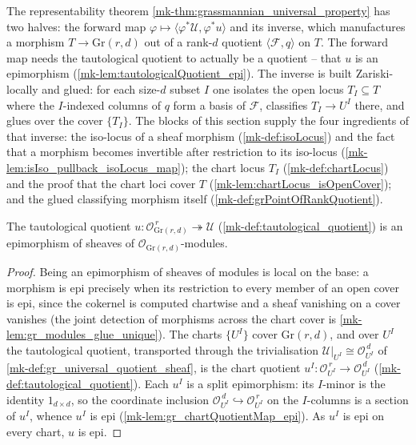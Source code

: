 The representability theorem \ref{mk-thm:grassmannian_universal_property} has two halves:
the forward map \(\varphi \mapsto \langle \varphi^{*}\mathcal{U}, \varphi^{*}u\rangle\)
and its inverse, which manufactures a morphism \(T \to \mathrm{Gr}(r,d)\) out of a rank-\(d\)
quotient \(\langle \mathcal{F}, q\rangle\) on \(T\). The forward map needs the tautological
quotient to actually be a quotient -- that \(u\) is an epimorphism
(\ref{mk-lem:tautologicalQuotient_epi}). The inverse is built Zariski-locally and glued: for
each size-\(d\) subset \(I\) one isolates the open locus \(T_I \subseteq T\) where the
\(I\)-indexed columns of \(q\) form a basis of \(\mathcal{F}\), classifies \(T_I \to U^I\)
there, and glues over the cover \(\{T_I\}\). The blocks of this section supply the four
ingredients of that inverse: the iso-locus of a sheaf morphism (\ref{mk-def:isoLocus}) and
the fact that a morphism becomes invertible after restriction to its iso-locus
(\ref{mk-lem:isIso_pullback_isoLocus_map}); the chart locus \(T_I\) (\ref{mk-def:chartLocus})
and the proof that the chart loci cover \(T\) (\ref{mk-lem:chartLocus_isOpenCover}); and the
glued classifying morphism itself (\ref{mk-def:grPointOfRankQuotient}).

\begin{lemma}\label{mk-lem:tautologicalQuotient_epi}
  \leanok

  The tautological quotient \(u : \mathcal{O}_{\mathrm{Gr}(r,d)}^{\,r}
  \twoheadrightarrow \mathcal{U}\) (\ref{mk-def:tautological_quotient}) is an epimorphism of
  sheaves of \(\mathcal{O}_{\mathrm{Gr}(r,d)}\)-modules.
\end{lemma}
\begin{proof}
  Being an epimorphism of sheaves of modules is local on the base: a morphism is epi
  precisely when its restriction to every member of an open cover is epi, since the
  cokernel is computed chartwise and a sheaf vanishing on a cover vanishes
  (the joint detection of morphisms across the chart cover is
  \ref{mk-lem:gr_modules_glue_unique}). The charts
  \(\{U^I\}\) cover \(\mathrm{Gr}(r,d)\), and over \(U^I\) the tautological quotient,
  transported through the trivialisation \(\mathcal{U}|_{U^I} \cong \mathcal{O}_{U^I}^{\,d}\)
  of \ref{mk-def:gr_universal_quotient_sheaf}, is the chart quotient \(u^I :
  \mathcal{O}_{U^I}^{\,r} \to \mathcal{O}_{U^I}^{\,d}\) (\ref{mk-def:tautological_quotient}).
  Each \(u^I\) is a split epimorphism: its \(I\)-minor is the identity \(1_{d\times d}\),
  so the coordinate inclusion \(\mathcal{O}_{U^I}^{\,d} \hookrightarrow
  \mathcal{O}_{U^I}^{\,r}\) on the \(I\)-columns is a section of \(u^I\), whence \(u^I\) is
  epi (\ref{mk-lem:gr_chartQuotientMap_epi}). As \(u^I\) is epi on every chart, \(u\) is epi.
\end{proof}


